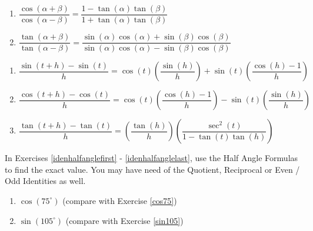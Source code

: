 \begin{multicols}{2}

\begin{enumerate}

\setcounter{enumi}{\value{HW}}

\item $\dfrac{\cos(\alpha + \beta)}{\cos(\alpha - \beta)} = \dfrac{1 - \tan(\alpha)\tan(\beta)}{1 + \tan(\alpha)\tan(\beta)}$
\item $\dfrac{\tan(\alpha + \beta)}{\tan(\alpha - \beta)} = \dfrac{\sin(\alpha)\cos(\alpha) + \sin(\beta)\cos(\beta)}{\sin(\alpha)\cos(\alpha) - \sin(\beta)\cos(\beta)}$

\setcounter{HW}{\value{enumi}}

\end{enumerate}

\end{multicols}

\begin{enumerate}

\setcounter{enumi}{\value{HW}}

\item $\dfrac{\sin(t + h) - \sin(t)}{h} = \cos(t) \left(\dfrac{\sin(h)}{h} \right) + \sin(t) \left( \dfrac{\cos(h) - 1}{h} \right)$
\item $\dfrac{\cos(t + h) - \cos(t)}{h} = \cos(t) \left( \dfrac{\cos(h) - 1}{h} \right) - \sin(t) \left(\dfrac{\sin(h)}{h} \right)$
\item  $\dfrac{\tan(t + h) - \tan(t)}{h} = \left( \dfrac{\tan(h)}{h} \right) \left(\dfrac{\sec^{2}(t)}{1 - \tan(t)\tan(h)} \right)$ \label{identlastident}

\setcounter{HW}{\value{enumi}}

\end{enumerate}



In Exercises \ref{idenhalfanglefirst} - \ref{idenhalfanglelast}, use the Half Angle Formulas to find the exact value.  You may have need of the Quotient, Reciprocal or Even / Odd Identities as well.

\begin{multicols}{2}

\begin{enumerate}

\setcounter{enumi}{\value{HW}}

\item  $\cos(75^{\circ})$  (compare with Exercise \ref{cos75}) \label{idenhalfanglefirst}
\item  $\sin(105^{\circ})$  (compare with Exercise \ref{sin105})

\setcounter{HW}{\value{enumi}}

\end{enumerate}

\end{multicols}

